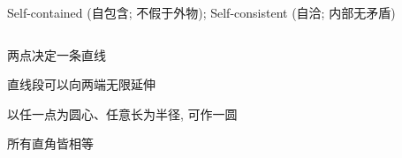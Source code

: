 
\begin{frame}{}
  \begin{center}

    \vspace{1em}
    Self-contained (自包含; 不假于外物); Self-consistent (自洽; 内部无矛盾)

  \end{center}
\end{frame}



\begin{frame}{}
  \begin{columns}
  \end{columns}

  \vspace{0.30cm}
  \begin{description}[(平行公设)]
    \item[直线公设] 两点决定一条直线
    \item[\gray{延伸公设}] 直线段可以向两端无限延伸
    \item[圆公设] 以任一点为圆心、任意长为半径, 可作一圆
    \item[角公设] 所有直角皆相等
    \item[平行公设] 
  \end{description}
\end{frame}

